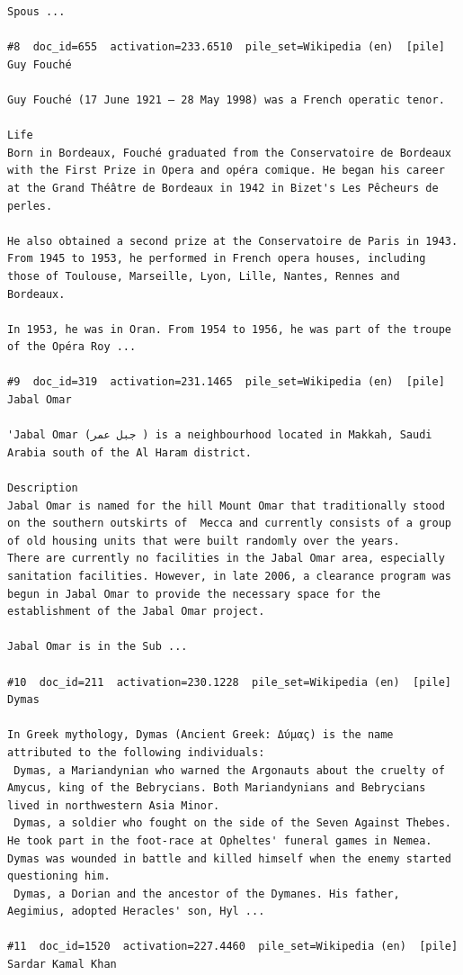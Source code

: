 \begin{verbatim}
Spous ...

#8  doc_id=655  activation=233.6510  pile_set=Wikipedia (en)  [pile]
Guy Fouché

Guy Fouché (17 June 1921 – 28 May 1998) was a French operatic tenor.

Life 
Born in Bordeaux, Fouché graduated from the Conservatoire de Bordeaux with the First Prize in Opera and opéra comique. He began his career at the Grand Théâtre de Bordeaux in 1942 in Bizet's Les Pêcheurs de perles.

He also obtained a second prize at the Conservatoire de Paris in 1943. From 1945 to 1953, he performed in French opera houses, including those of Toulouse, Marseille, Lyon, Lille, Nantes, Rennes and Bordeaux.

In 1953, he was in Oran. From 1954 to 1956, he was part of the troupe of the Opéra Roy ...

#9  doc_id=319  activation=231.1465  pile_set=Wikipedia (en)  [pile]
Jabal Omar

'Jabal Omar (جبل عمر ) is a neighbourhood located in Makkah, Saudi Arabia south of the Al Haram district.

Description 
Jabal Omar is named for the hill Mount Omar that traditionally stood on the southern outskirts of  Mecca and currently consists of a group of old housing units that were built randomly over the years. 
There are currently no facilities in the Jabal Omar area, especially sanitation facilities. However, in late 2006, a clearance program was begun in Jabal Omar to provide the necessary space for the establishment of the Jabal Omar project. 

Jabal Omar is in the Sub ...

#10  doc_id=211  activation=230.1228  pile_set=Wikipedia (en)  [pile]
Dymas

In Greek mythology, Dymas (Ancient Greek: Δύμας) is the name attributed to the following individuals:
 Dymas, a Mariandynian who warned the Argonauts about the cruelty of Amycus, king of the Bebrycians. Both Mariandynians and Bebrycians lived in northwestern Asia Minor.
 Dymas, a soldier who fought on the side of the Seven Against Thebes. He took part in the foot-race at Opheltes' funeral games in Nemea. Dymas was wounded in battle and killed himself when the enemy started questioning him.
 Dymas, a Dorian and the ancestor of the Dymanes. His father, Aegimius, adopted Heracles' son, Hyl ...

#11  doc_id=1520  activation=227.4460  pile_set=Wikipedia (en)  [pile]
Sardar Kamal Khan


\end{verbatim}
